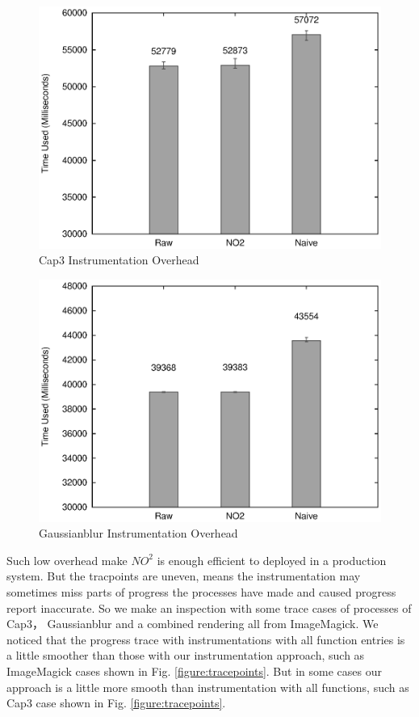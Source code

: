 \begin{figure}
\centering
  \includegraphics[width=0.9\columnwidth]{figures/overhead_cap3.eps}
\caption{Cap3 Instrumentation Overhead}
\label{figure:overhead_cap3}
\end{figure}

\begin{figure}
\centering
  \includegraphics[width=0.9\columnwidth]{figures/overhead_gaussianblur.eps}
\caption{Gaussianblur Instrumentation Overhead}
\label{figure:overhead_gaussianblur}
\end{figure}

Such low overhead make $NO^2$ is enough efficient to deployed in a production system. But the tracpoints are uneven, means the instrumentation may sometimes miss parts of progress the processes have made and caused progress report inaccurate. So we make an inspection with some trace cases of processes of Cap3， Gaussianblur and a combined rendering all from ImageMagick. We noticed that the progress trace with instrumentations with all function entries is a little smoother than those with our instrumentation approach, such as ImageMagick cases shown in Fig. \ref{figure:tracepoints}. But in some cases our approach is a little more smooth than instrumentation with all functions, such as Cap3 case shown in Fig. \ref{figure:tracepoints}.

